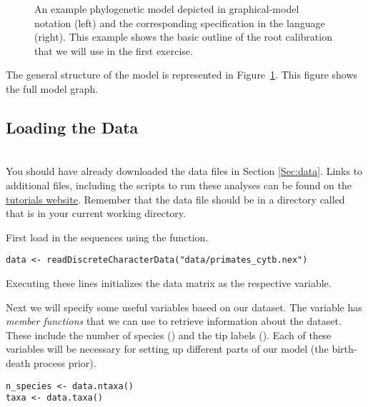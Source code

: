 \begin{figure}[h!]
\centering
{}
\caption{\small An example phylogenetic model depicted in graphical-model notation (left) and the corresponding specification in the \Rev language (right).
This example shows the basic outline of the root calibration that we will use in the first exercise.}
\label{fig:clock_prior}
\end{figure}

The general structure of the model is represented in Figure~\ref{fig:clock_prior}.
This figure shows the full model graph.


\bigskip

\subsection{Loading the Data}

\noindent \\ \impmark You should have already downloaded the data files in Section \ref{Sec:data}. 
Links to additional files, including the scripts to run these analyses can be found on the \href{http://revbayes.github.io/tutorials.html}{\RevBayes tutorials website}. 
Remember that the data file should be in a directory called  that is in your current working directory.

First load in the sequences using the  function. 
{\tt \begin{snugshade*}
\begin{lstlisting}
data <- readDiscreteCharacterData("data/primates_cytb.nex")
\end{lstlisting}
\end{snugshade*}}
Executing these lines initializes the data matrix as the respective \Rev variable. 

Next we will specify some useful variables based on our dataset. 
The variable  has \textit{member functions} that we can use to retrieve information about the dataset. 
These include the number of species () and the tip labels ().
Each of these variables will be necessary for setting up different parts of our model (\EG the birth-death process prior).
{\tt \begin{snugshade*}
\begin{lstlisting}
n_species <- data.ntaxa()
taxa <- data.taxa()	
\end{lstlisting}
\end{snugshade*}}

